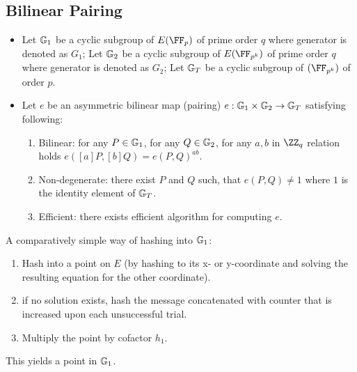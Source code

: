 \subsection*{Bilinear Pairing}
\begin{itemize}[label=$\circ$]
    \item Let $\mathbb{G}_1$ be a cyclic subgroup of $E(\FF_p)$ of prime order $q$ where generator is denoted as $G_1$; Let $\mathbb{G}_2$ be a cyclic subgroup of $E(\FF_{p^k})$ of prime order $q$ where generator is denoted as $G_2$; Let $\mathbb{G}_T$ be a cyclic subgroup of $(\FF_{p^k})$ of order $p$.
    \item Let $e$ be an asymmetric bilinear map (pairing) $e: \mathbb{G}_1 \times \mathbb{G}_2 \rightarrow \mathbb{G}_T$ satisfying following:
    \begin{enumerate}
        \item Bilinear: for any $P \in \mathbb{G}_1$, for any $Q \in \mathbb{G}_2$, for any $a, b$ in $\ZZ_q$ relation holds $e([a]P, [b]Q) = e(P, Q)^{ab}$.
        \item Non-degenerate: there exist $P$ and $Q$ such, that $e(P, Q) \neq 1$ where $1$ is the identity element of $\mathbb{G}_T$.
        \item Efficient: there exists efficient algorithm for computing $e$.
    \end{enumerate}
\end{itemize}


A comparatively simple way of hashing into $\mathbb{G}_1$:
\begin{enumerate}
    \item Hash into a point on $E$ (by hashing to its x- or y-coordinate and solving the resulting equation for the other coordinate).
    \item if no solution exists, hash the message concatenated with counter that is increased upon each unsuccessful trial.
    \item Multiply the point by cofactor $h_1$.
\end{enumerate}
This yields a point in $\mathbb{G}_1$.


